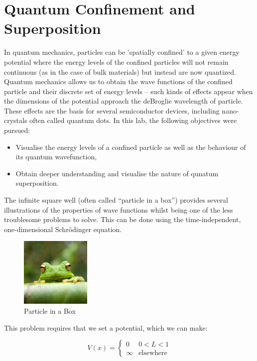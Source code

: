 \renewcommand{\chaptername}{Feb 8th: Lab}
\chapter{Quantum Confinement and Superposition}
In quantum mechanics, particles can be 'spatially confined' to a given energy potential where the energy levels of the confined particles will not remain continuous (as in the case of bulk materials) but instead are now quantized.
Quantum mechanics allows us to obtain the wave functions of the confined particle and their discrete set of energy levels -- such kinds of effects appear when the dimensions of the potential approach the deBroglie wavelength of particle. These effects are the basis for several semiconductor devices, including nano-crystals often called quantum dots.
In this lab, the following objectives were pursued:
\begin{itemize}
    \item Visualise the energy levels of a confined particle as well as the behaviour of its quantum wavefunction,
    \item Obtain deeper understanding and visualise the nature of qunatum superposition.
\end{itemize}

The infinite square well (often called ``particle in a box'') provides several illustrations of the properties of wave functions whilst being one of the less troublesome problems to solve. This can be done using the time-independent, one-dimensional Schrödinger equation.

\begin{figure}[h]
    \centering
    \includegraphics[width=0.3\textwidth]{frog.jpg} %
    \caption{Particle in a Box}
    \label{fig:particleInABox}
\end{figure}

This problem requires that we set a potential, which we can make:

\[
  V(x) = \begin{cases}
  0 & 0 < L < 1\\
  \infty & \text{elsewhere}
\end{cases}
\]


